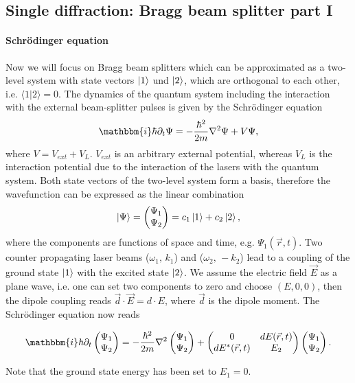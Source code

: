 \documentclass[12pt]{article}
\newcommand{\ic}{\mathbbm{i}}
\begin{document}
\subsection{Single diffraction: Bragg beam splitter part I}
\paragraph{Schrödinger equation}
Now we will focus on Bragg beam splitters which can be approximated as a two-level system with state vectors $\ket{1}$ und $\ket{2}$, which are orthogonal to each other, i.e. $\langle 1 | 2 \rangle=0$. 
The dynamics of the quantum system including the interaction with the external beam-splitter pulses is given by the Schrödinger equation
\begin{align}
  \ic\hbar \partial_t \Psi = -\frac{\hbar^2}{2m} \nabla^2\Psi + V\Psi, \label{eq:sgl_ini}
\end{align}
where $V=V_{ext}+V_L$. $V_{ext}$ is an arbitrary external potential, whereas $V_L$ is the interaction potential due to the interaction of the lasers with the quantum system.
Both state vectors of the two-level system form a basis, therefore the wavefunction can be expressed as the linear combination 
\begin{align}
  \ket{\Psi} = 
  \begin{pmatrix}
    \Psi_1 \\
    \Psi_2 
  \end{pmatrix} =
  c_1\ket{1}+ c_2\ket{2}, 
\end{align}
where  the components are functions of space and time, e.g.  $\Psi_1(\vec{r},t)$.
Two counter propagating laser beams ($\omega_1,\, k_1$) and ($\omega_2,\, -k_2$) lead to a coupling of the ground state $\ket{1}$ with the excited state $\ket{2}$. We assume the electric field $\vec{E}$ as a plane wave, i.e. one can set two components to zero and choose $(E,0,0)$, then the dipole coupling reads $\vec{d} \cdot \vec{E} = d\cdot E$, where $\vec{d}$ is the dipole moment. 
The Schrödinger equation now reads
\begin{tcolorbox}
\begin{align}
  \ic \hbar \partial_t \begin{pmatrix}
    \Psi_1 \\
    \Psi_2 
  \end{pmatrix} = 
  -\frac{\hbar^2}{2m}\nabla^2\begin{pmatrix}
    \Psi_1 \\
    \Psi_2 
  \end{pmatrix} +
  \begin{pmatrix}
    0 & dE(\vec{r},t) \\
    dE^*(\vec{r},t) & E_2 
  \end{pmatrix}\begin{pmatrix}
    \Psi_1 \\
    \Psi_2 
  \end{pmatrix}.
\end{align}
\end{tcolorbox}
Note that the ground state energy has been set to $E_1=0$. 
\end{document}
